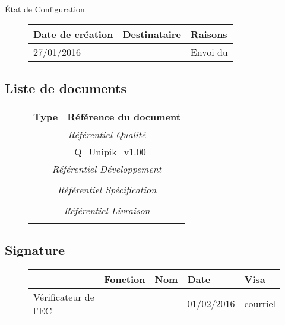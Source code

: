 \documentclass[asi, sansVersion]{picInsa}
\begin{document}
\begin{center}
\huge
\nomEquipe{}\\
État de Configuration\\
\end{center}
\vspace{0.5cm}


\begin{figure}[H]
		\centering
		\begin{tabularx}{17cm}{|p{4cm}|X|X|}
		\hline
		\rowcolor[gray]{0.85}Date de création & Destinataire & Raisons \\
		\hline
		27/01/2016 & \nomClient{} & Envoi du \PQ{} \\
		\hline
		\end{tabularx}
\end{figure}

\subsection*{Liste de documents}

\begin{figure}[H]
		\centering
		\begin{tabularx}{17cm}{|p{7cm}|X|}
		\hline
		\rowcolor[gray]{0.85}Type & Référence du document\\
		\hline
		\multicolumn{2}{|c|}{\textit{Référentiel Qualité}}\\
		\hline 
		 \PQ & \PQCourt\_Q\_Unipik\_v1.00 \\
		 \hline 
		\multicolumn{2}{|c|}{\textit{Référentiel Développement}}\\
		\hline 
		 &   \\
		\hline 
		\multicolumn{2}{|c|}{\textit{Référentiel Spécification}}\\
		\hline
		& \\
		\hline 
		\multicolumn{2}{|c|}{\textit{Référentiel Livraison}}\\
		\hline
		& \\
		\hline 
		\end{tabularx}
\end{figure}

\subsection*{Signature}

\begin{figure}[H]
		\centering
		\begin{tabularx}{17cm}{|p{4cm}|X|X|X|X|}
		\hline
		\rowcolor[gray]{0.85}& Fonction & Nom & Date & Visa \\
		\hline
		 Vérificateur de l'EC & \RGC & \Mathieu & 01/02/2016 & courriel \\
		\hline
		\end{tabularx}
\end{figure}
\end{document}
